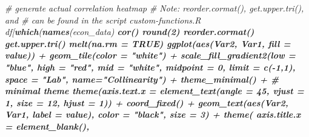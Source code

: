 \documentclass[12pt,letterpaper,toc=flat,oneside]{report}
\newenvironment{Shaded}{\begin{snugshade}}{\end{snugshade}}
\newcommand{\CommentTok}[1]{\textcolor[rgb]{0.56,0.35,0.01}{\textit{#1}}}
\newcommand{\DataTypeTok}[1]{\textcolor[rgb]{0.13,0.29,0.53}{#1}}
\newcommand{\DecValTok}[1]{\textcolor[rgb]{0.00,0.00,0.81}{#1}}
\newcommand{\KeywordTok}[1]{\textcolor[rgb]{0.13,0.29,0.53}{\textbf{#1}}}
\newcommand{\NormalTok}[1]{#1}
\newcommand{\OperatorTok}[1]{\textcolor[rgb]{0.81,0.36,0.00}{\textbf{#1}}}
\newcommand{\OtherTok}[1]{\textcolor[rgb]{0.56,0.35,0.01}{#1}}
\newcommand{\StringTok}[1]{\textcolor[rgb]{0.31,0.60,0.02}{#1}}
\theoremstyle{definition}
\theoremstyle{definition}
\theoremstyle{definition}
\theoremstyle{remark}
\begin{document}
\begin{Shaded}
\begin{Highlighting}[]
{{{{{{{{{{{{{{{{\CommentTok{# generate actual correlation heatmap}
\CommentTok{# Note: reorder.cormat(), get.upper.tri(), and %
\CommentTok{# can be found in the script custom-functions.R}
\NormalTok{df[}\KeywordTok{which}\NormalTok{(}\KeywordTok{names}\NormalTok{(econ_data) }\OperatorTok{%
\StringTok{  }\KeywordTok{cor}\NormalTok{() }\OperatorTok{%
\StringTok{  }\KeywordTok{round}\NormalTok{(}\DecValTok{2}\NormalTok{) }\OperatorTok{%
\StringTok{  }\KeywordTok{reorder.cormat}\NormalTok{() }\OperatorTok{%
\StringTok{  }\KeywordTok{get.upper.tri}\NormalTok{() }\OperatorTok{%
\StringTok{  }\KeywordTok{melt}\NormalTok{(}\DataTypeTok{na.rm =} \OtherTok{TRUE}\NormalTok{) }\OperatorTok{%
\StringTok{  }\KeywordTok{ggplot}\NormalTok{(}\KeywordTok{aes}\NormalTok{(Var2, Var1, }\DataTypeTok{fill =}\NormalTok{ value)) }\OperatorTok{+}
\StringTok{  }\KeywordTok{geom_tile}\NormalTok{(}\DataTypeTok{color =} \StringTok{"white"}\NormalTok{) }\OperatorTok{+}
\StringTok{  }\KeywordTok{scale_fill_gradient2}\NormalTok{(}\DataTypeTok{low =} \StringTok{"blue"}\NormalTok{, }\DataTypeTok{high =} \StringTok{"red"}\NormalTok{, }\DataTypeTok{mid =} \StringTok{"white"}\NormalTok{, }
                       \DataTypeTok{midpoint =} \DecValTok{0}\NormalTok{, }\DataTypeTok{limit =} \KeywordTok{c}\NormalTok{(}\OperatorTok{-}\DecValTok{1}\NormalTok{,}\DecValTok{1}\NormalTok{), }\DataTypeTok{space =} \StringTok{"Lab"}\NormalTok{, }
                       \DataTypeTok{name=}\StringTok{"Collinearity"}\NormalTok{) }\OperatorTok{+}
\StringTok{  }\KeywordTok{theme_minimal}\NormalTok{() }\OperatorTok{+}\StringTok{ }\CommentTok{# minimal theme}
\StringTok{  }\KeywordTok{theme}\NormalTok{(}\DataTypeTok{axis.text.x =} \KeywordTok{element_text}\NormalTok{(}\DataTypeTok{angle =} \DecValTok{45}\NormalTok{, }\DataTypeTok{vjust =} \DecValTok{1}\NormalTok{, }
                                   \DataTypeTok{size =} \DecValTok{12}\NormalTok{, }\DataTypeTok{hjust =} \DecValTok{1}\NormalTok{)) }\OperatorTok{+}
\StringTok{  }\KeywordTok{coord_fixed}\NormalTok{() }\OperatorTok{+}\StringTok{ }
\StringTok{  }\KeywordTok{geom_text}\NormalTok{(}\KeywordTok{aes}\NormalTok{(Var2, Var1, }\DataTypeTok{label =}\NormalTok{ value), }\DataTypeTok{color =} \StringTok{"black"}\NormalTok{, }\DataTypeTok{size =} \DecValTok{3}\NormalTok{) }\OperatorTok{+}
\StringTok{  }\KeywordTok{theme}\NormalTok{(}
    \DataTypeTok{axis.title.x =} \KeywordTok{element_blank}\NormalTok{(),}
}}}}}}}}}}}}}}}}}}}}}}}
\end{Highlighting}
\end{Shaded}
\end{document}
